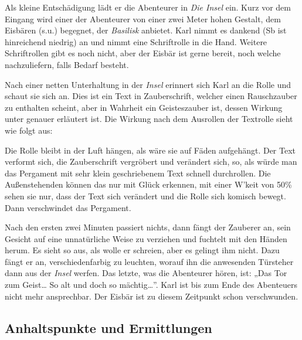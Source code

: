 \documentclass[a4paper,10pt]{scrartcl}
\def\drugname{Basilisk}
\begin{document}
\bestiarium[name=Karl Petrov, mag=true, typ=Mensch, grad=6,
In=m95, LP=20, AP=80, zauberEW=18, bes={Sb 10, Wk 70}, St=55, Gw=45]{}

Als kleine Entschädigung lädt er die Abenteurer in \emph{Die Insel} ein.
Kurz vor dem Eingang wird einer der Abenteurer von einer zwei Meter
hohen Gestalt, dem Eisbären (s.u.) begegnet, der \emph{\drugname{}}
anbietet. Karl nimmt es dankend (Sb ist hinreichend niedrig) an und
nimmt eine Schriftrolle in die Hand. Weitere Schriftrollen gibt es noch
nicht, aber der Eisbär ist gerne bereit, noch welche nachzuliefern,
falls Bedarf besteht.

\bestiarium[name=Bar, mag=false, typ=Mensch, grad=6,
In=m83, LP=34, AP=100, bes={Ko 81, Gs 70}, St=97, Gw=57]{}

Nach einer netten Unterhaltung in der \emph{Insel} erinnert sich Karl
an die Rolle und schaut sie sich an. Dies ist ein Text in Zauberschrift,
welcher einen Rauschzauber zu enthalten scheint, aber in Wahrheit ein
Geisteszauber ist, dessen Wirkung unter genauer erläutert ist. Die
Wirkung nach dem Ausrollen der Textrolle sieht wie folgt aus:

Die Rolle bleibt in der Luft hängen, als wäre sie auf Fäden aufgehängt.
Der Text verformt sich, die Zauberschrift vergröbert und verändert sich,
so, als würde man das Pergament mit sehr klein geschriebenem Text
schnell durchrollen.  Die Außenstehenden können das nur mit Glück
erkennen, mit einer W'keit von 50\% sehen sie nur, dass der Text sich
verändert und die Rolle sich komisch bewegt. Dann verschwindet das
Pergament.

Nach den ersten zwei Minuten passiert nichts, dann fängt der Zauberer
an, sein Gesicht auf eine unnatürliche Weise zu verziehen und fuchtelt
mit den Händen herum. Es sieht so aus, als wolle er schreien, aber es
gelingt ihm nicht. Dazu fängt er an, verschiedenfarbig zu leuchten,
worauf ihn die anwesenden Türsteher dann aus der \emph{Insel} werfen.
Das letzte, was die Abenteurer hören, ist: „Das Tor zum Geist… So alt
und doch so mächtig…”. Karl ist bis zum Ende des Abenteuers nicht mehr
ansprechbar. Der Eisbär ist zu diesem Zeitpunkt schon verschwunden. 

\subsection{Anhaltspunkte und Ermittlungen}
\end{document}
